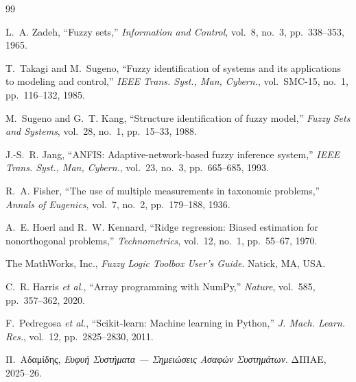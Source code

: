 \documentclass[conference]{IEEEtran}
\begin{document}
\begin{thebibliography}{99}

L.~A. Zadeh, ``Fuzzy sets,'' \textit{Information and Control}, vol.~8, no.~3,
pp.~338--353, 1965.

T.~Takagi and M.~Sugeno, ``Fuzzy identification of systems and its applications
to modeling and control,'' \textit{IEEE Trans. Syst., Man, Cybern.}, vol.~SMC-15,
no.~1, pp.~116--132, 1985.

M.~Sugeno and G.~T. Kang, ``Structure identification of fuzzy model,''
\textit{Fuzzy Sets and Systems}, vol.~28, no.~1, pp.~15--33, 1988.

J.-S.~R. Jang, ``ANFIS: Adaptive-network-based fuzzy inference system,''
\textit{IEEE Trans. Syst., Man, Cybern.}, vol.~23, no.~3, pp.~665--685, 1993.

R.~A. Fisher, ``The use of multiple measurements in taxonomic problems,''
\textit{Annals of Eugenics}, vol.~7, no.~2, pp.~179--188, 1936.

A.~E. Hoerl and R.~W. Kennard, ``Ridge regression: Biased estimation for
nonorthogonal problems,'' \textit{Technometrics}, vol.~12, no.~1, pp.~55--67, 1970.

The MathWorks, Inc., \textit{Fuzzy Logic Toolbox User's Guide}. Natick, MA, USA.

C.~R. Harris \textit{et al.}, ``Array programming with NumPy,''
\textit{Nature}, vol.~585, pp.~357--362, 2020.

F.~Pedregosa \textit{et al.}, ``Scikit-learn: Machine learning in Python,''
\textit{J. Mach. Learn. Res.}, vol.~12, pp.~2825--2830, 2011.

Π.~Αδαμίδης, \textit{Ευφυή Συστήματα — Σημειώσεις Ασαφών Συστημάτων}.
ΔΙΠΑΕ, 2025--26.

\end{thebibliography}
\end{document}
